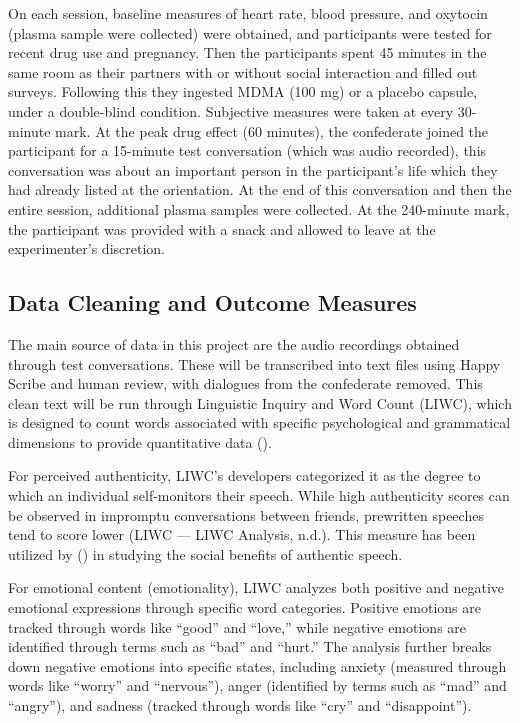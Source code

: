 \documentclass[
  man,
  longtable,
  nolmodern,
  notxfonts,
  notimes,
  colorlinks=true,linkcolor=blue,citecolor=blue,urlcolor=blue]{apa7}
\begin{document}
On each session, baseline measures of heart rate, blood pressure, and
oxytocin (plasma sample were collected) were obtained, and participants
were tested for recent drug use and pregnancy. Then the participants
spent 45 minutes in the same room as their partners with or without
social interaction and filled out surveys. Following this they ingested
MDMA (100 mg) or a placebo capsule, under a double-blind condition.
Subjective measures were taken at every 30-minute mark. At the peak drug
effect (60 minutes), the confederate joined the participant for a
15-minute test conversation (which was audio recorded), this
conversation was about an important person in the participant's life
which they had already listed at the orientation. At the end of this
conversation and then the entire session, additional plasma samples were
collected. At the 240-minute mark, the participant was provided with a
snack and allowed to leave at the experimenter's discretion.

\subsection{Data Cleaning and Outcome
Measures}\label{data-cleaning-and-outcome-measures}

The main source of data in this project are the audio recordings
obtained through test conversations. These will be transcribed into text
files using Happy Scribe and human review, with dialogues from the
confederate removed. This clean text will be run through Linguistic
Inquiry and Word Count (LIWC), which is designed to count words
associated with specific psychological and grammatical dimensions to
provide quantitative data
().

For perceived authenticity, LIWC's developers categorized it as the
degree to which an individual self-monitors their speech. While high
authenticity scores can be observed in impromptu conversations between
friends, prewritten speeches tend to score lower (LIWC --- LIWC
Analysis, n.d.). This measure has been utilized by
() in
studying the social benefits of authentic speech.

For emotional content (emotionality), LIWC analyzes both positive and
negative emotional expressions through specific word categories.
Positive emotions are tracked through words like ``good'' and ``love,''
while negative emotions are identified through terms such as ``bad'' and
``hurt.'' The analysis further breaks down negative emotions into
specific states, including anxiety (measured through words like
``worry'' and ``nervous''), anger (identified by terms such as ``mad''
and ``angry''), and sadness (tracked through words like ``cry'' and
``disappoint'').
\end{document}
